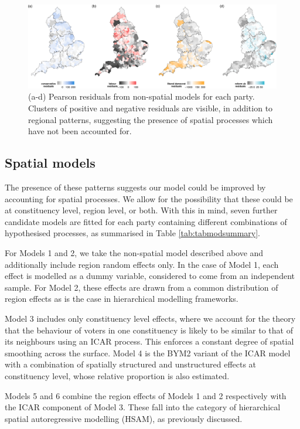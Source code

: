 \documentclass[webpdf,large,contemporary,namedate]{oup-authoring-template}
\theoremstyle{thmstyleone}
\theoremstyle{thmstyletwo}
\theoremstyle{thmstylethree}
\begin{document}
\begin{figure}[th]
\includegraphics[width=1\linewidth]{jrss_resubmission_files/figure-latex/fignonspatial-1} \caption{(a-d) Pearson residuals from non-spatial models for each party. Clusters of positive and negative residuals are visible, in addition to regional patterns, suggesting the presence of spatial processes which have not been accounted for.}\label{fig:fignonspatial}
\end{figure}

\subsection{Spatial models}\label{spatial-models}

The presence of these patterns suggests our model could be improved by
accounting for spatial processes. We allow for the possibility that
these could be at constituency level, region level, or both. With this
in mind, seven further candidate models are fitted for each party
containing different combinations of hypothesised processes, as
summarised in Table \ref{tab:tabmodsummary}.

For Models 1 and 2, we take the non-spatial model described above and
additionally include region random effects only. In the case of Model 1,
each effect is modelled as a dummy variable, considered to come from an
independent sample. For Model 2, these effects are drawn from a common
distribution of region effects as is the case in hierarchical modelling
frameworks.

Model 3 includes only constituency level effects, where we account for
the theory that the behaviour of voters in one constituency is likely to
be similar to that of its neighbours using an ICAR process. This
enforces a constant degree of spatial smoothing across the surface.
Model 4 is the BYM2 variant of the ICAR model with a combination of
spatially structured and unstructured effects at constituency level,
whose relative proportion is also estimated.

Models 5 and 6 combine the region effects of Models 1 and 2 respectively
with the ICAR component of Model 3. These fall into the category of
hierarchical spatial autoregressive modelling (HSAM), as previously
discussed.
\end{document}
